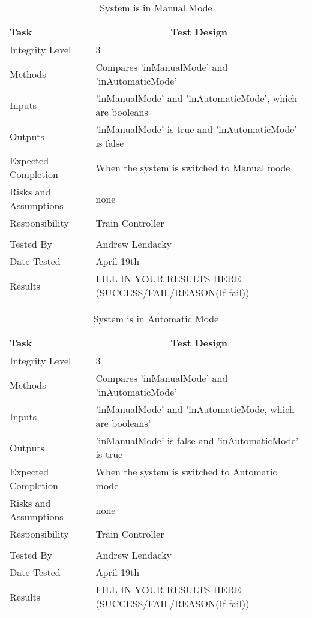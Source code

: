 \documentclass[]{article}
\begin{document}
\begin{table}[H]
	\centering
	\caption{System is in Manual Mode}
	\begin{tabular}{|l|l|}
		\hline
		Task & \multicolumn{1}{c|}{Test Design} \\ \hline
		Integrity Level & 3 \\ \hline
		Methods & Compares 'inManualMode' and 'inAutomaticMode'\\ \hline
		Inputs & 'inManualMode' and 'inAutomaticMode', which are booleans\\ \hline
		Outputs & 'inManualMode' is true and 'inAutomaticMode' is false \\ \hline
		Expected Completion & When the system is switched to Manual mode\\ \hline
		Risks and Assumptions & none\\ \hline
		Responsibility & Train Controller\\ \hline
			\\ \hline
		Tested By   &  Andrew Lendacky\\	\hline
		Date Tested & \parbox[t]{10cm}{April 19th}\\ \hline
		Results & FILL IN YOUR RESULTS HERE (SUCCESS/FAIL/REASON(If fail))\\ \hline
	\end{tabular}
\end{table}

\begin{table}[H]
	\centering
	\caption{System is in Automatic Mode}
	\begin{tabular}{|l|l|}
		\hline
		Task & \multicolumn{1}{c|}{Test Design} \\ \hline
		Integrity Level & 3 \\ \hline
		Methods & Compares 'inManualMode' and 'inAutomaticMode'\\ \hline
		Inputs & 'inManualMode' and 'inAutomaticMode, which are booleans'\\ \hline
		Outputs & 'inManualMode' is false and 'inAutomaticMode' is true \\ \hline
		Expected Completion & When the system is switched to Automatic mode\\ \hline
		Risks and Assumptions & none\\ \hline
		Responsibility & Train Controller\\ \hline
			\\ \hline
		Tested By   &  Andrew Lendacky\\	\hline
		Date Tested & \parbox[t]{10cm}{April 19th}\\ \hline
		Results & FILL IN YOUR RESULTS HERE (SUCCESS/FAIL/REASON(If fail))\\ \hline
	\end{tabular}
\end{table}
\end{document}
